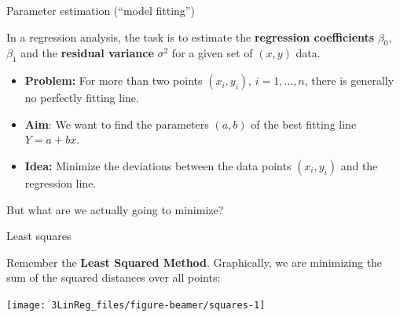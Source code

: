 \documentclass[10pt,ignorenonframetext,]{beamer}
\providecommand{\tightlist}{%
  \setlength{\itemsep}{0pt}\setlength{\parskip}{0pt}}
\begin{document}
\begin{frame}

\begin{block}{Parameter estimation (``model fitting'')}

\vspace{2mm}

In a regression analysis, the task is to estimate the \textbf{regression
coefficients} \(\beta_0\), \(\beta_1\) and the \textbf{residual
variance} \(\sigma^2\) for a given set of \((x,y)\) data.

\vspace{4mm}

\begin{itemize}
\item
  \textbf{Problem:} For more than two points \((x_i,y_i)\),
  \(i=1,\ldots, n\), there is generally no perfectly fitting line.
  \vspace{2mm}
\item
  \textbf{Aim}: We want to find the parameters \((a,b)\) of the best
  fitting line \(Y = a + b x\).
\end{itemize}

\vspace{2mm}

\begin{itemize}
\tightlist
\item
  \textbf{Idea:} Minimize the deviations between the data points
  \((x_i,y_i)\) and the regression line.
\end{itemize}

\vspace{4mm}

But what are we actually going to minimize?

\end{block}

\end{frame}

\begin{frame}

\begin{block}{Least squares}

Remember the \textbf{Least Squared Method}. Graphically, we are
minimizing the sum of the squared distances over all points:

\begin{center}\texttt{[image: 3LinReg\_files/figure-beamer/squares-1]} \end{center}

\end{block}

\end{frame}
\end{document}
